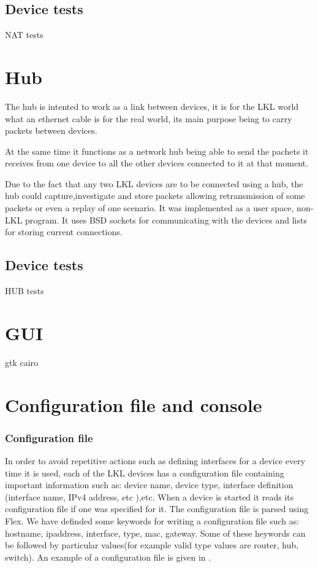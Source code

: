 {{\subsection{Device tests}
\label{sub-sec:nat-tests}
NAT tests

\section{Hub}
\label{sec:hub:impl}

The hub is intented to work as a link between devices, it is for the LKL world what an ethernet cable is for the real world, its main purpose being to carry packets between devices.

At the same time it functions as a network hub being able to send the pachets it receives from one device to all the other devices connected to it at that moment.

Due to the fact that any two LKL devices are to be connected using a hub, the hub could capture,investigate and store packets allowing retransmission of some packets or even a replay of one scenario.  
It was implemented as a user space, non-LKL program. It uses BSD sockets for communicating with the devices and lists for storing current connections.
\subsection{Device tests}
\label{sub-sec:router-tests}
HUB tests

\section{GUI}
\label{sec:gui}

gtk 
cairo

\section{Configuration file and console}
\label{sec:config}

\subsubsection{Configuration file}
\label{subsec:config-file}
In order to avoid repetitive actions such as defining interfaces for a device every time it is used, each of the LKL devices has a configuration file containing important information such as: device name, device type, interface definition (interface name, IPv4 address, etc ),etc. When a device is started it reads its configuration file if one was specified for it. The configuration file is parsed using Flex. We have definded some keywords for writing a configuration file such as: hostname, ipaddress, interface, type, mac, gateway. Some of these heywords can be followed by particular values(for example valid type values are router, hub, switch). An example of a configuration file is given in .

}}
